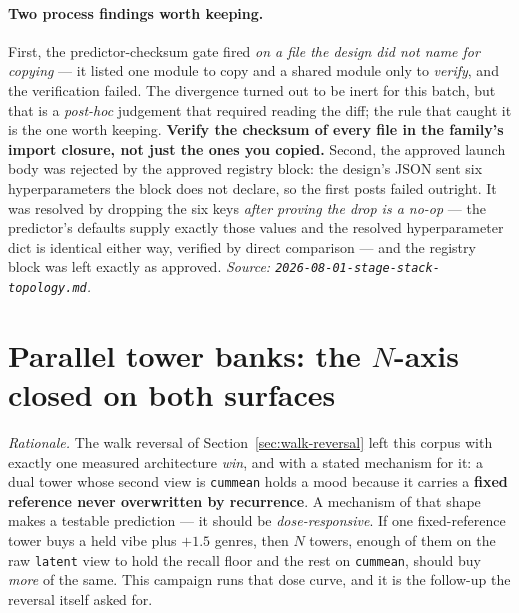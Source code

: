 \documentclass[11pt]{article}
\begin{document}
\paragraph{Two process findings worth keeping.} First, the predictor-checksum gate
fired \emph{on a file the design did not name for copying} --- it listed one module
to copy and a shared module only to \emph{verify}, and the verification failed. The
divergence turned out to be inert for this batch, but that is a \emph{post-hoc}
judgement that required reading the diff; the rule that caught it is the one worth
keeping. \textbf{Verify the checksum of every file in the family's import closure,
not just the ones you copied.} Second, the approved launch body was rejected by the
approved registry block: the design's JSON sent six hyperparameters the block does
not declare, so the first posts failed outright. It was resolved by dropping the
six keys \emph{after proving the drop is a no-op} --- the predictor's defaults supply
exactly those values and the resolved hyperparameter dict is identical either way,
verified by direct comparison --- and the registry block was left exactly as
approved.
\emph{Source: \texttt{2026-08-01-stage-stack-topology.md}.}

\section{Parallel tower banks: the $N$-axis closed on both surfaces}
\label{sec:towerbank}
\emph{Rationale.} The walk reversal of Section~\ref{sec:walk-reversal} left this
corpus with exactly one measured architecture \emph{win}, and with a stated
mechanism for it: a dual tower whose second view is \texttt{cummean} holds a mood
because it carries a \textbf{fixed reference never overwritten by recurrence}. A
mechanism of that shape makes a testable prediction --- it should be
\emph{dose-responsive}. If one fixed-reference tower buys a held vibe plus
$+\num{1.5}$ genres, then $N$ towers, enough of them on the raw \texttt{latent}
view to hold the recall floor and the rest on \texttt{cummean}, should buy
\emph{more} of the same. This campaign runs that dose curve, and it is the
follow-up the reversal itself asked for.
\end{document}
